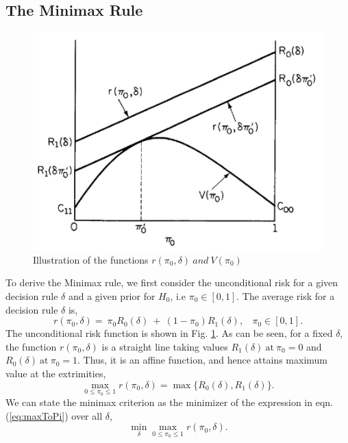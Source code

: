 \documentclass[a4paper,english,12pt]{article}
\begin{document}
\subsection{The Minimax Rule}
\begin{figure}[h]
	\centering
	\includegraphics[width=0.9\linewidth]{Figures/minimax1}
	\caption[abc]{Illustration of the functions $r(\pi_0,\delta)~and~V(\pi_0)$}
	\label{fig:minimax1}
\end{figure}
To derive the Minimax rule, we first consider the unconditional risk for a given decision rule $\delta$ and a given prior for $H_0$, i.e $\pi_0 \in [0,1]$. The average risk for a decision rule $\delta$ is,
\begin{equation}
r(\pi_0,\delta)=~\pi_0R_0(\delta)~+~(1-\pi_0)R_1(\delta), ~~~~\pi_0 \in [0,1].
\end{equation}
The unconditional risk function is shown in Fig. \ref{fig:minimax1}. As can be seen, for a fixed $\delta$, the function $r(\pi_0,\delta)$ is a straight line taking values $R_1(\delta)~\mbox{at}~\pi_0=0$ and $R_0(\delta)~\mbox{at}~\pi_0=1$. Thus, it is an affine function, and hence attains maximum value at the extrimities,
\begin{equation}\label{eq:maxToPi}
	\mathop {\max }\limits_{0 \le {\pi _0} \le 1} r({\pi _0},\delta ) = \max\{ {R_0}(\delta ),{R_1}(\delta )\}.
\end{equation}
We can state the minimax criterion as the minimizer of the expression in eqn. (\ref{eq:maxToPi}) over all $\delta$,
\begin{equation}\label{eq:minMaxCrit}
		\mathop {\min}\limits_{\delta}\mathop {\max }\limits_{0 \le {\pi _0} \le 1} r({\pi _0},\delta ).
\end{equation}
\end{document}

